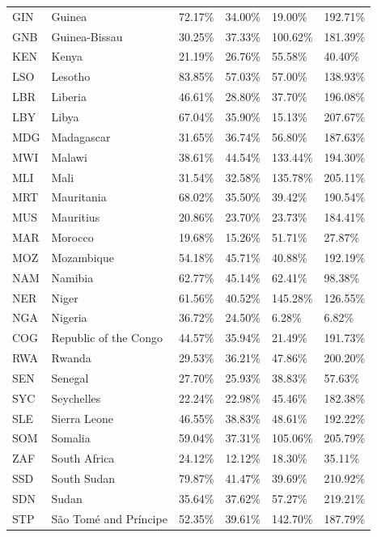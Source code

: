 \begin{table}[htbp]
\begin{tabular}{llllll}
  GIN & Guinea & 72.17\% & 34.00\% & 19.00\% & 192.71\% \\ 
  GNB & Guinea-Bissau & 30.25\% & 37.33\% & 100.62\% & 181.39\% \\ 
  KEN & Kenya & 21.19\% & 26.76\% & 55.58\% & 40.40\% \\ 
  LSO & Lesotho & 83.85\% & 57.03\% & 57.00\% & 138.93\% \\ 
  LBR & Liberia & 46.61\% & 28.80\% & 37.70\% & 196.08\% \\ 
  LBY & Libya & 67.04\% & 35.90\% & 15.13\% & 207.67\% \\ 
  MDG & Madagascar & 31.65\% & 36.74\% & 56.80\% & 187.63\% \\ 
  MWI & Malawi & 38.61\% & 44.54\% & 133.44\% & 194.30\% \\ 
  MLI & Mali & 31.54\% & 32.58\% & 135.78\% & 205.11\% \\ 
  MRT & Mauritania & 68.02\% & 35.50\% & 39.42\% & 190.54\% \\ 
  MUS & Mauritius & 20.86\% & 23.70\% & 23.73\% & 184.41\% \\ 
  MAR & Morocco & 19.68\% & 15.26\% & 51.71\% & 27.87\% \\ 
  MOZ & Mozambique & 54.18\% & 45.71\% & 40.88\% & 192.19\% \\ 
  NAM & Namibia & 62.77\% & 45.14\% & 62.41\% & 98.38\% \\ 
  NER & Niger & 61.56\% & 40.52\% & 145.28\% & 126.55\% \\ 
  NGA & Nigeria & 36.72\% & 24.50\% & 6.28\% & 6.82\% \\ 
  COG & Republic of the Congo & 44.57\% & 35.94\% & 21.49\% & 191.73\% \\ 
  RWA & Rwanda & 29.53\% & 36.21\% & 47.86\% & 200.20\% \\ 
  SEN & Senegal & 27.70\% & 25.93\% & 38.83\% & 57.63\% \\ 
  SYC & Seychelles & 22.24\% & 22.98\% & 45.46\% & 182.38\% \\ 
  SLE & Sierra Leone & 46.55\% & 38.83\% & 48.61\% & 192.22\% \\ 
  SOM & Somalia & 59.04\% & 37.31\% & 105.06\% & 205.79\% \\ 
  ZAF & South Africa & 24.12\% & 12.12\% & 18.30\% & 35.11\% \\ 
  SSD & South Sudan & 79.87\% & 41.47\% & 39.69\% & 210.92\% \\ 
  SDN & Sudan & 35.64\% & 37.62\% & 57.27\% & 219.21\% \\ 
  STP & São Tomé and Príncipe & 52.35\% & 39.61\% & 142.70\% & 187.79\% \\ 

\end{tabular}
\end{table}
